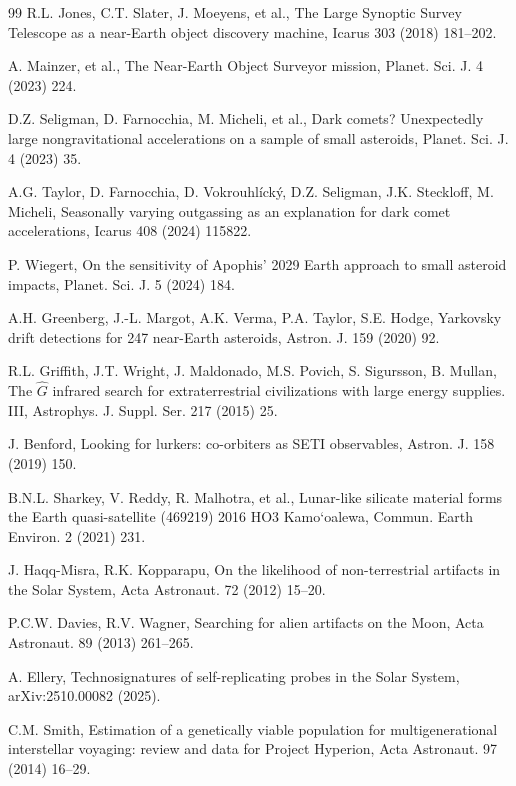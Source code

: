 \documentclass[preprint,12pt]{elsarticle}
\theoremstyle{definition}
\begin{document}
\begin{thebibliography}{99}
 R.L. Jones, C.T. Slater, J. Moeyens, et al., The Large Synoptic Survey Telescope as a near-Earth object discovery machine, Icarus 303 (2018) 181--202.

 A. Mainzer, et al., The Near-Earth Object Surveyor mission, Planet. Sci. J. 4 (2023) 224. 

 D.Z. Seligman, D. Farnocchia, M. Micheli, et al., Dark comets? Unexpectedly large nongravitational accelerations on a sample of small asteroids, Planet. Sci. J. 4 (2023) 35.

 A.G. Taylor, D. Farnocchia, D. Vokrouhl\'ick\'y, D.Z. Seligman, J.K. Steckloff, M. Micheli, Seasonally varying outgassing as an explanation for dark comet accelerations, Icarus 408 (2024) 115822.

 P. Wiegert, On the sensitivity of Apophis' 2029 Earth approach to small asteroid impacts, Planet. Sci. J. 5 (2024) 184.

 A.H. Greenberg, J.-L. Margot, A.K. Verma, P.A. Taylor, S.E. Hodge, Yarkovsky drift detections for 247 near-Earth asteroids, Astron. J. 159 (2020) 92.

 R.L. Griffith, J.T. Wright, J. Maldonado, M.S. Povich, S. Sigur{\dh}sson, B. Mullan, The $\hat{G}$ infrared search for extraterrestrial civilizations with large energy supplies. III, Astrophys. J. Suppl. Ser. 217 (2015) 25.

 J. Benford, Looking for lurkers: co-orbiters as SETI observables, Astron. J. 158 (2019) 150.

 B.N.L. Sharkey, V. Reddy, R. Malhotra, et al., Lunar-like silicate material forms the Earth quasi-satellite (469219) 2016 HO3 Kamo`oalewa, Commun. Earth Environ. 2 (2021) 231.

 J. Haqq-Misra, R.K. Kopparapu, On the likelihood of non-terrestrial artifacts in the Solar System, Acta Astronaut. 72 (2012) 15--20.

 P.C.W. Davies, R.V. Wagner, Searching for alien artifacts on the Moon, Acta Astronaut. 89 (2013) 261--265.

 A. Ellery, Technosignatures of self-replicating probes in the Solar System, arXiv:2510.00082 (2025).

 C.M. Smith, Estimation of a genetically viable population for multigenerational interstellar voyaging: review and data for Project Hyperion, Acta Astronaut. 97 (2014) 16--29.


\end{thebibliography}
\end{document}
